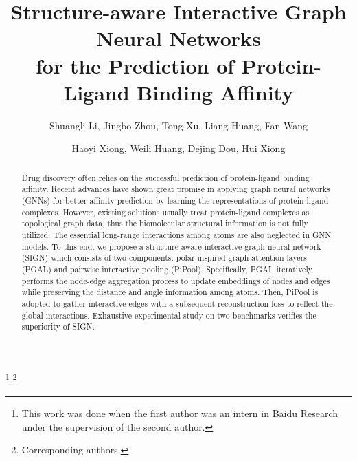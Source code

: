 \documentclass[sigconf]{acmart}
\newcommand{\model}{\textsf{SIGN}\xspace}
\newcommand{\gnn}{PGAL\xspace}
\newcommand{\pool}{PiPool\xspace}
\begin{document}
\fancyhead{}


\title{Structure-aware Interactive Graph Neural Networks \\ for the Prediction of Protein-Ligand Binding Affinity}

\author{Shuangli Li{}, Jingbo Zhou{}, Tong Xu{}, Liang Huang{}, Fan Wang{}}
\author{Haoyi Xiong{}, Weili Huang{}, Dejing Dou{}, Hui Xiong{}}
\thanks{This work was done when the first author was an intern in Baidu Research under the supervision of the second author.}
\thanks{Corresponding authors.}







\begin{abstract} \label{sec-abstract}





Drug discovery often relies on the successful prediction of protein-ligand binding affinity. Recent advances have shown great promise in applying graph neural networks (GNNs) for better affinity prediction by learning the representations of protein-ligand complexes. However, existing solutions usually treat protein-ligand complexes as topological graph data, thus the biomolecular structural information is not fully utilized. The essential long-range interactions among atoms are also neglected in GNN models. To this end, we propose a structure-aware interactive graph neural network (\model) which consists of two components: polar-inspired graph attention layers (\gnn) and pairwise interactive pooling (\pool).  Specifically, \gnn iteratively performs the node-edge aggregation process to update embeddings of nodes and edges while preserving the distance and angle information among atoms. Then, \pool is adopted to gather interactive edges with a subsequent reconstruction loss to reflect the global interactions. 
Exhaustive experimental study on two benchmarks verifies the superiority of \model.







\end{abstract}
\end{document}
